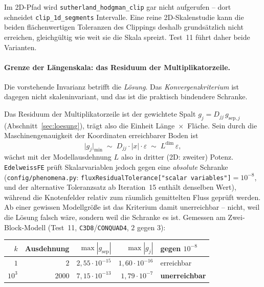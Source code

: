 \documentclass[a4paper,11pt]{article}
\def\bm#1{#1}%
\def\tilde#1{#1}%
\newcommand{\code}[1]{\texttt{\small #1}}
\newcommand{\file}[1]{\texttt{\small #1}}
\begin{document}
\noindent Im 2D-Pfad wird \code{sutherland\_hodgman\_clip} gar nicht aufgerufen -- dort schneidet
\code{clip\_1d\_segments} Intervalle. Eine reine 2D-Skalenstudie kann die beiden flächenwertigen
Toleranzen des Clippings deshalb grundsätzlich nicht erreichen, gleichgültig wie weit sie die
Skala spreizt. Test~11 führt daher beide Varianten.

\paragraph{Grenze der Längenskala: das Residuum der Multiplikatorzeile.}
\label{sec:scalelimit}
Die vorstehende Invarianz betrifft die \emph{Lösung}. Das \emph{Konvergenzkriterium} ist dagegen
nicht skaleninvariant, und das ist die praktisch bindendere Schranke.

Das Residuum der Multiplikatorzeile ist der gewichtete Spalt
$\tilde g_j = \tilde D_{jj}\,g_{\text{sep},j}$ (Abschnitt~\ref{sec:loesung}), trägt also die
Einheit Länge~$\times$~Fläche. Sein durch die Maschinengenauigkeit der Koordinaten erreichbarer
Boden ist
\begin{equation}
\big|\tilde g_j\big|_{\min} \;\sim\; \tilde D_{jj}\cdot|\bm x|\cdot\varepsilon
\;\sim\; L^{\dim}\,\varepsilon ,
\label{eq:gapfloor}
\end{equation}
wächst mit der Modellausdehnung $L$ also in dritter (2D: zweiter) Potenz. \code{EdelweissFE}
prüft Skalarvariablen jedoch gegen eine \emph{absolute} Schranke
(\file{config/phenomena.py}: \code{fluxResidualTolerance["scalar variables"]}${}=10^{-8}$, und der
alternative Toleranzsatz ab Iteration~15 enthält denselben Wert), während die Knotenfelder relativ
zum räumlich gemittelten Fluss geprüft werden. Ab einer gewissen Modellgröße ist das Kriterium
damit unerreichbar -- nicht, weil die Lösung falsch wäre, sondern weil die Schranke es ist.
Gemessen am Zwei-Block-Modell (Test~11, \code{C3D8}/\code{CONQUAD4}, $2$ gegen $3$):

\begin{center}
\small
\begin{tabular}{rrrrl}
\toprule
$k$ & Ausdehnung & $\max|g_{\text{sep}}|$ & $\max|\tilde g_j|$ & gegen $10^{-8}$ \\
\midrule
$1$      & $2$    & $2{,}55\cdot10^{-15}$ & $1{,}60\cdot10^{-16}$ & erreichbar \\
$10^{3}$ & $2000$ & $7{,}15\cdot10^{-13}$ & $1{,}79\cdot10^{-7}$  & \textbf{unerreichbar} \\
\bottomrule
\end{tabular}
\end{center}
\end{document}
